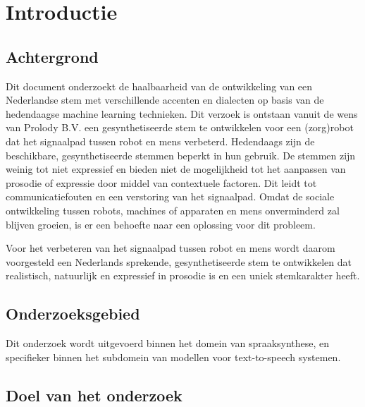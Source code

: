 \chapter{Introductie}

\section{Achtergrond}
Dit document onderzoekt de haalbaarheid van de ontwikkeling van een Nederlandse stem met verschillende accenten en dialecten op basis van de hedendaagse machine learning technieken. Dit verzoek is ontstaan vanuit de wens van Prolody B.V. een gesynthetiseerde stem te ontwikkelen voor een (zorg)robot dat het signaalpad tussen robot en mens verbeterd. Hedendaags zijn de beschikbare, gesynthetiseerde stemmen beperkt in hun gebruik. De stemmen zijn weinig tot niet expressief en bieden niet de mogelijkheid tot het aanpassen van prosodie of expressie door middel van contextuele factoren. Dit leidt tot communicatiefouten en een verstoring van het signaalpad. Omdat de sociale ontwikkeling tussen robots, machines of apparaten en mens onverminderd zal blijven groeien, is er een behoefte naar een oplossing voor dit probleem.

Voor het verbeteren van het signaalpad tussen robot en mens wordt daarom voorgesteld een Nederlands sprekende, gesynthetiseerde stem te ontwikkelen dat realistisch, natuurlijk en expressief in prosodie is en een uniek stemkarakter heeft.

\section{Onderzoeksgebied}
Dit onderzoek wordt uitgevoerd binnen het domein van spraaksynthese, en specifieker binnen het subdomein van modellen voor text-to-speech systemen.

\section{Doel van het onderzoek}

